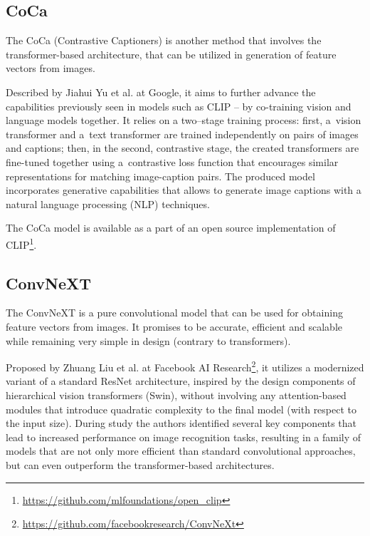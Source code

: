 \subsection{CoCa}
\label{section:CoCa}

The CoCa (Contrastive Captioners) is another method that involves the transformer-based architecture, that can be utilized in generation of feature vectors from images.

Described by Jiahui Yu et al. \cite{Yu-2022} at Google, it aims to further advance the capabilities previously seen in models such as CLIP – by co-training vision and language models together. It relies on a two–stage training process: first, a~vision transformer and a~text transformer are trained independently on pairs of images and captions; then, in the second, contrastive stage, the created transformers are fine-tuned together using a~contrastive loss function that encourages similar representations for matching image-caption pairs. The produced model incorporates generative capabilities that allows to generate image captions with a natural language processing (NLP) techniques.

The CoCa model is available as a part of an open source implementation of CLIP\footnote{\url{https://github.com/mlfoundations/open_clip}}.


\subsection{ConvNeXT}
\label{section:ConvNeXT}

The ConvNeXT is a pure convolutional model that can be used for obtaining feature vectors from images. It promises to be accurate, efficient and scalable while remaining very simple in design (contrary to transformers).

Proposed by Zhuang Liu et al. \cite{Liu-2022} at Facebook AI Research\footnote{\url{https://github.com/facebookresearch/ConvNeXt}}, it utilizes a modernized variant of a standard ResNet architecture, inspired by the design components of hierarchical vision transformers (Swin), without involving any attention-based modules that introduce quadratic complexity to the final model (with respect to the input size). During study the authors identified several key components that lead to increased performance on image recognition tasks, resulting in a family of models that are not only more efficient than standard convolutional approaches, but can even outperform the transformer-based architectures.


